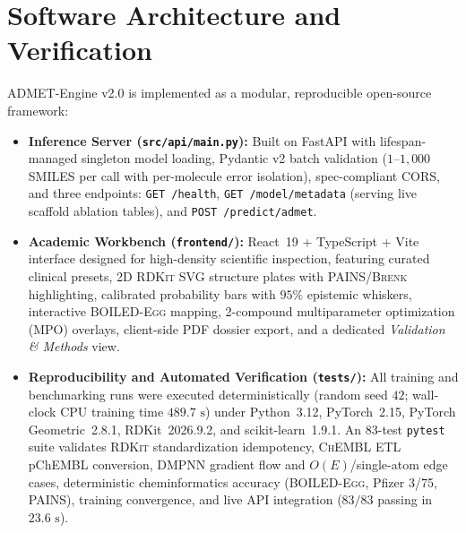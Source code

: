 \documentclass[10pt,twocolumn,letterpaper]{article}
\begin{document}
\section{Software Architecture and Verification}
ADMET-Engine v2.0 is implemented as a modular, reproducible open-source framework:
\begin{itemize}
  \item \textbf{Inference Server (\texttt{src/api/main.py}):} Built on FastAPI with lifespan-managed singleton model loading, Pydantic v2 batch validation ($1$–$1{,}000$ \textsc{SMILES} per call with per-molecule error isolation), spec-compliant \textsc{CORS}, and three endpoints: \texttt{GET /health}, \texttt{GET /model/metadata} (serving live scaffold ablation tables), and \texttt{POST /predict/admet}.
  \item \textbf{Academic Workbench (\texttt{frontend/}):} React~19 + TypeScript + Vite interface designed for high-density scientific inspection, featuring curated clinical presets, 2D \textsc{RDKit} \textsc{SVG} structure plates with \textsc{PAINS}/\textsc{Brenk} highlighting, calibrated probability bars with $95\%$ epistemic whiskers, interactive \textsc{BOILED-Egg} mapping, 2-compound multiparameter optimization (\textsc{MPO}) overlays, client-side \textsc{PDF} dossier export, and a dedicated \textit{Validation \& Methods} view.
  \item \textbf{Reproducibility and Automated Verification (\texttt{tests/}):} All training and benchmarking runs were executed deterministically (random seed $42$; wall-clock CPU training time $489.7\text{ s}$) under Python~3.12, PyTorch~2.15, PyTorch Geometric~2.8.1, RDKit~2026.9.2, and scikit-learn~1.9.1. An $83$-test \texttt{pytest} suite validates \textsc{RDKit} standardization idempotency, \textsc{ChEMBL} \textsc{ETL} pChEMBL conversion, \textsc{DMPNN} gradient flow and $O(E)$/single-atom edge cases, deterministic cheminformatics accuracy (\textsc{BOILED-Egg}, Pfizer 3/75, \textsc{PAINS}), training convergence, and live \textsc{API} integration ($83/83$ passing in $23.6\text{ s}$).
\end{itemize}

\end{document}
